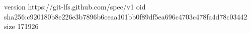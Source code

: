 version https://git-lfs.github.com/spec/v1
oid sha256:c920180b8e226e3b7896b6ceaa101bb0f89df5ea696c4703c478fa4d78c03442
size 171926

